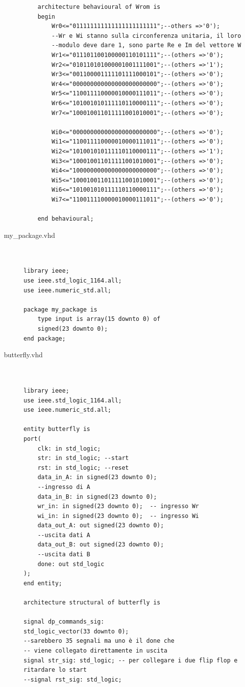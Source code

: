\documentclass[a4paper, titlepage]{article}
\begin{document}
\begin{description}
\begin{verbatim}
	architecture behavioural of Wrom is
	begin
		Wr0<="011111111111111111111111";--others =>'0');
		--Wr e Wi stanno sulla circonferenza unitaria, il loro 
		--modulo deve dare 1, sono parte Re e Im del vettore W
		Wr1<="011101100100000110101111";--(others =>'0');
		Wr2<="010110101000001001111001";--(others =>'1');
		Wr3<="001100001111101111000101";--(others =>'0');
		Wr4<="000000000000000000000000";--(others =>'0');
		Wr5<="110011110000010000111011";--(others =>'0');
		Wr6<="101001010111110110000111";--(others =>'0');
		Wr7<="100010011011111001010001";--(others =>'0');
		
		Wi0<="000000000000000000000000";--(others =>'0'); 
		Wi1<="110011110000010000111011";--(others =>'0');
		Wi2<="101001010111110110000111";--(others =>'1');
		Wi3<="100010011011111001010001";--(others =>'0');
		Wi4<="100000000000000000000000";--(others =>'0');
		Wi5<="100010011011111001010001";--(others =>'0');
		Wi6<="101001010111110110000111";--(others =>'0');
		Wi7<="110011110000010000111011";--(others =>'0');
		
	end behavioural;	

\end{verbatim}
\item [my\_package.vhd]
\begin{verbatim}


library ieee;
use ieee.std_logic_1164.all;
use ieee.numeric_std.all;

package my_package is
	type input is array(15 downto 0) of 
	signed(23 downto 0);
end package;

\end{verbatim}
\item [butterfly.vhd]
\begin{verbatim}


library ieee;
use ieee.std_logic_1164.all;
use ieee.numeric_std.all;

entity butterfly is 
port(
	clk: in std_logic;
	str: in std_logic; --start
	rst: in std_logic; --reset
	data_in_A: in signed(23 downto 0);
	--ingresso di A 
	data_in_B: in signed(23 downto 0);
	wr_in: in signed(23 downto 0);	-- ingresso Wr
	wi_in: in signed(23 downto 0);	-- ingresso Wi
	data_out_A: out signed(23 downto 0);
	--uscita dati A
	data_out_B: out signed(23 downto 0); 
	--uscita dati B
	done: out std_logic
);
end entity;

architecture structural of butterfly is

signal dp_commands_sig: 
std_logic_vector(33 downto 0); 
--sarebbero 35 segnali ma uno è il done che
-- viene collegato direttamente in uscita
signal str_sig: std_logic; -- per collegare i due flip flop e ritardare lo start
--signal rst_sig: std_logic;


\end{verbatim}
\end{description}
\end{document}
